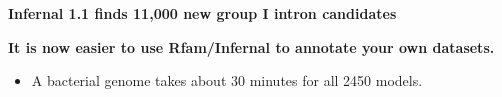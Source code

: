 \documentclass[landscape]{slides}
\begin{document}
%
%
\begin{slide}
\begin{center}
\textbf{Infernal 1.1 finds 11,000 new group I intron candidates}
\end{center}


\vfill
\vfill
\small
{} 
\end{slide}
\begin{slide}
\begin{center}
\textbf{It is now easier to use Rfam/Infernal to annotate your own
  datasets.} \\

\small
\begin{itemize}
\item A bacterial genome takes about 30 minutes for all 2450 models.
\end{itemize}

\end{center}


\vfill
\small
{} 
\end{slide}
\end{document}
